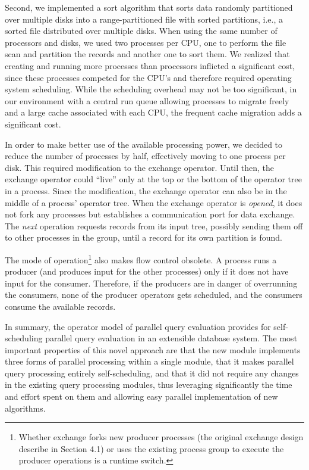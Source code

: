 \documentclass[a4paper,11pt,notitlepage,twoside,openright]{article}
\begin{document}
Second, we implemented a sort algorithm that sorts
data randomly partitioned over multiple disks into a range-partitioned
file with sorted partitions, i.e., a sorted file distributed
over multiple disks. When using the same number
of processors and disks, we used two processes per CPU,
one to perform the file scan and partition the records and
another one to sort them. We realized that creating and
running more processes than processors inflicted a significant
cost, since these processes competed for the CPU's and
therefore required operating system scheduling. While the
scheduling overhead may not be too significant, in our
environment with a central run queue allowing processes to
migrate freely and a large cache associated with each CPU,
the frequent cache migration adds a significant cost.

In order to make better use of the available processing
power, we decided to reduce the number of processes
by half, effectively moving to one process per disk. This
required modification to the exchange operator. Until then,
the exchange operator could ``live'' only at the top or the
bottom of the operator tree in a process. Since the modification,
the exchange operator can also be in the middle of
a process' operator tree. When the exchange operator is
\emph{opened}, it does not fork any processes but establishes a
communication port for data exchange. The \emph{next} operation
requests records from its input tree, possibly sending them
off to other processes in the group, until a record for its
own partition is found.

The mode of operation\footnote{%
Whether exchange forks new producer processes (the original
exchange design describe in Section 4.1) or uses the existing
process group to execute the producer operations is a runtime
switch.%
} also makes flow control
obsolete. A process runs a producer (and produces input
for the other processes) only if it does not have input for
the consumer. Therefore, if the producers are in danger of
overrunning the consumers, none of the producer operators
gets scheduled, and the consumers consume the available
records.

In summary, the operator model of parallel query
evaluation provides for self-scheduling parallel query evaluation
in an extensible database system. The most important
properties of this novel approach are that the new module
implements three forms of parallel processing within a single
module, that it makes parallel query processing entirely
self-scheduling, and that it did not require any changes in
the existing query processing modules, thus leveraging significantly
the time and effort spent on them and allowing
easy parallel implementation of new algorithms.
\end{document}
